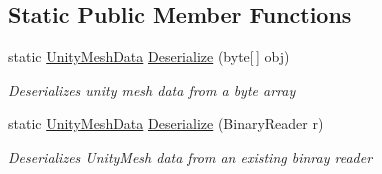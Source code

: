 \subsection*{Static Public Member Functions}
\begin{DoxyCompactItemize}
\item 
static \mbox{\hyperlink{class_virt_muse_web_1_1_utility_1_1_unity_mesh_data}{Unity\+Mesh\+Data}} \mbox{\hyperlink{class_virt_muse_web_1_1_utility_1_1_unity_mesh_data_a72d47231711a93e536a91a202d07caef}{Deserialize}} (byte\mbox{[}$\,$\mbox{]} obj)
\begin{DoxyCompactList}\small\item\em Deserializes unity mesh data from a byte array \end{DoxyCompactList}\item 
static \mbox{\hyperlink{class_virt_muse_web_1_1_utility_1_1_unity_mesh_data}{Unity\+Mesh\+Data}} \mbox{\hyperlink{class_virt_muse_web_1_1_utility_1_1_unity_mesh_data_abfb03456d3f2baa170d038b6d189fbab}{Deserialize}} (Binary\+Reader r)
\begin{DoxyCompactList}\small\item\em Deserializes Unity\+Mesh data from an existing binray reader \end{DoxyCompactList}\end{DoxyCompactItemize}
